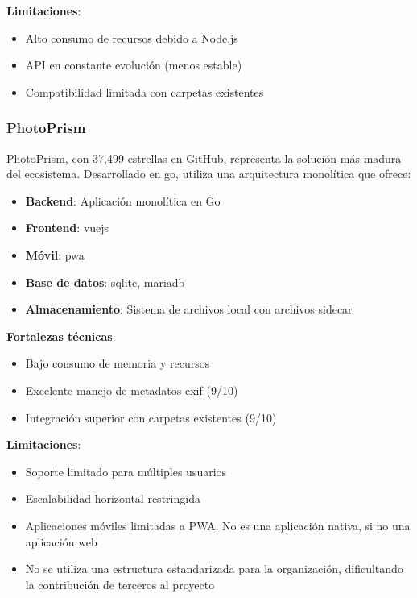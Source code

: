 \textbf{Limitaciones}:
\begin{itemize}
    \item Alto consumo de recursos debido a Node.js
    \item API en constante evolución (menos estable)
    \item Compatibilidad limitada con carpetas existentes
\end{itemize}

\subsubsection{PhotoPrism}

PhotoPrism, con 37,499 estrellas en GitHub, representa la solución más madura del ecosistema. Desarrollado en \gls{go}, utiliza una arquitectura monolítica que ofrece:

\begin{itemize}
    \item \textbf{Backend}: Aplicación monolítica en Go
    \item \textbf{Frontend}: \gls{vuejs}
    \item \textbf{Móvil}: \acrfull{pwa}
    \item \textbf{Base de datos}: \gls{sqlite}, \gls{mariadb}
    \item \textbf{Almacenamiento}: Sistema de archivos local con archivos \gls{sidecar}
\end{itemize}

\textbf{Fortalezas técnicas}:
\begin{itemize}
    \item Bajo consumo de memoria y recursos
    \item Excelente manejo de metadatos \acrshort{exif} (9/10)
    \item Integración superior con carpetas existentes (9/10)
\end{itemize}

\textbf{Limitaciones}:
\begin{itemize}
    \item Soporte limitado para múltiples usuarios
    \item Escalabilidad horizontal restringida
    \item Aplicaciones móviles limitadas a PWA. No es una aplicación nativa, si no una aplicación web
    \item No se utiliza una estructura estandarizada para la organización, dificultando la contribución de terceros al proyecto
\end{itemize}


